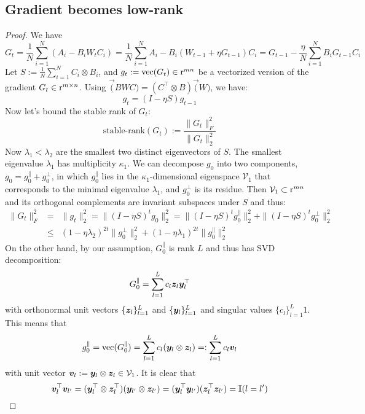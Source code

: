 \def\cV{\mathcal{V}}

\subsection{Gradient becomes low-rank}
\gradientlowrank*
{}
\begin{proof}
We have
\begin{equation}
    G_t = \frac{1}{N}\sum_{i=1}^N (A_i - B_i W_t C_i) = \frac{1}{N}\sum_{i=1}^N A_i - B_i(W_{t-1} + \eta G_{t-1})C_i = G_{t-1} - \frac{\eta}{N}\sum_{i=1}^N B_i G_{t-1} C_i
\end{equation}
Let $S := \frac{1}{N}\sum_{i=1}^N C_i\otimes B_i$, and $g_t := \mathrm{vec}(G_t) \in {\textnormal{r}}^{mn}$ be a vectorized version of the gradient $G_t\in {\textnormal{r}}^{m\times n}$. Using $\vec(BWC) = (C^\top \otimes B) \vec(W)$, we have:
\begin{equation}
    g_t = (I - \eta S) g_{t-1} 
\end{equation}
Now let's bound the stable rank of $G_t$:
\begin{equation}
    \text{stable-rank}(G_t) := \frac{\|G_t\|_F^2}{\|G_t\|^2_2} 
\end{equation}
Now $\lambda_1 < \lambda_2$ are the smallest two distinct eigenvectors of $S$. The smallest eigenvalue $\lambda_1$ has multiplicity $\kappa_1$. We can decompose $g_0$ into two components, $g_0 = g^{\parallel}_0 + g^\perp_0$, in which $g^{\parallel}_0$ lies in the $\kappa_1$-dimensional eigenspace $\cV_1$ that corresponds to the minimal eigenvalue $\lambda_1$, and $g^\perp_0$ is its residue. Then $\cV_1 \subset \rr^{mn}$ and its orthogonal complements are invariant subspaces under $S$ and thus: 
\begin{eqnarray}
    \|G_t\|_F^2 &=& \|g_t\|_2^2 = \|(I - \eta S)^t g_{0}\|^2_2 = \|(I - \eta S)^t g^{\parallel}_{0}\|^2_2 + \|(I - \eta S)^t g^{\perp}_{0}\|^2_2 \\
    &\le& (1 - \eta \lambda_2)^{2t} \|g^\perp_0\|_2^2 + (1 - \eta \lambda_1)^{2t} \|g^\parallel_0\|_2^2   
\end{eqnarray}
On the other hand, by our assumption, $G^\parallel_0$ is rank $L$ and thus has SVD decomposition:
\begin{equation}
    G^\parallel_0 = \sum_{l=1}^L c_l {\bm{z}}_l {\bm{y}}_l^\top
\end{equation}
with orthonormal unit vectors $\{{\bm{z}}_l\}_{l=1}^L$ and $\{{\bm{y}}_l\}_{l=1}^L$ and singular values $\{c_l\}_{l=1}^L1$. This means that 
\begin{equation}
    g^\parallel_0 = \mathrm{vec}(G^\parallel_0) = \sum_{l=1}^L c_l ({\bm{y}}_l \otimes {\bm{z}}_l) =: \sum_{l=1}^L c_l {\bm{v}}_l
\end{equation}
with unit vector $\vv_l := \vy_l \otimes \vz_l \in \cV_1$. It is clear that 
\begin{equation}
{\bm{v}}^\top_l {\bm{v}}_{l'} = ({\bm{y}}^\top_l \otimes {\bm{z}}^\top_l)({\bm{y}}_{l'} \otimes {\bm{z}}_{l'}) = ({\bm{y}}^\top_l {\bm{y}}_{l'})({\bm{z}}^\top_l {\bm{z}}_{l'}) = \mathbb{I}(l=l')
\end{equation}


\end{proof}
